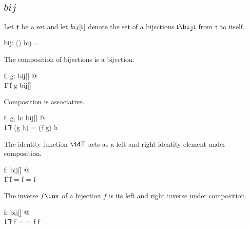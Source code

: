 \documentclass[11pt, oneside]{article}
\begin{document}
\subsection{$bij$}

Let $\mathsf{t}$ be a set and let $bij[\mathsf{t}]$ denote the set of a bijections $\genT \bij \genT$ from $\mathsf{t}$ to itself.

\begin{gendef}[\genT]
	bij: \power (\genT \fun \genT)
\where
	bij = \genT \bij \genT
\end{gendef}

\begin{remark}
The composition of bijections is a bijection.

\begin{zed}
	\forall f, g: bij[\setT] @ \\
	\t1	f \circ g \in bij[\setT]
\end{zed}

\end{remark}

\begin{remark}
Composition is associative.

\begin{zed}
	\forall f, g, h: bij[\setT] @ \\
	\t1	f \circ (g \circ h) = (f \circ g) \circ h
\end{zed}

\end{remark}

\begin{remark}
The identity function $\id \setT$ acts as a left and right identity element under composition.

\begin{zed}
	\forall f: bij[\setT] @ \\
	\t1	 \id \setT \circ f = f = f \circ \id \setT
\end{zed}

\end{remark}

\begin{remark}
The inverse $f \inv$ of a bijection $f$ is its left and right inverse under composition.

\begin{zed}
	\forall f: bij[\setT] @ \\
	\t1	f \circ f \inv = \id \setT = f \inv \circ f
\end{zed}

\end{remark}
\end{document}
